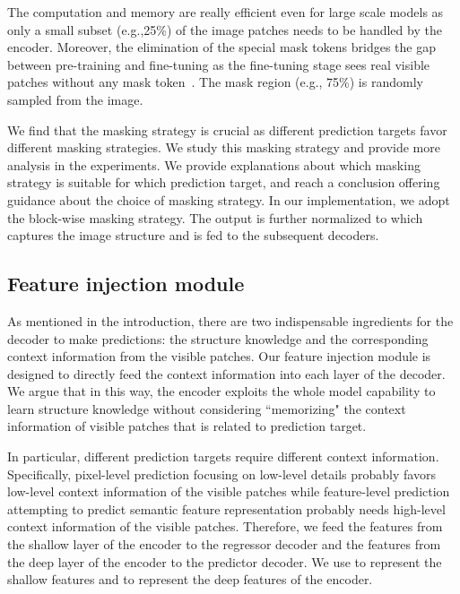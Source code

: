 \documentclass[runningheads]{llncs}
\begin{document}
The computation and memory are really efficient even for large scale models as only a small subset (e.g.,25\%) of the image patches needs to be handled by the encoder.
Moreover, the elimination of the special mask tokens bridges the gap between pre-training and fine-tuning as the fine-tuning stage sees real visible patches without any mask token~\cite{he2021masked,fang2022corrupted}.
The mask region (e.g., 75\%) is randomly sampled from the image.

We find that the masking strategy is crucial as different prediction targets favor different masking strategies.
We study this masking strategy and provide more analysis in the experiments.
We provide explanations about which masking strategy is suitable for which prediction target, and reach a conclusion offering guidance about the choice of masking strategy.
In our implementation, we adopt the block-wise masking strategy.
The output is further normalized to  which captures the image structure and is fed to the subsequent decoders.

\vspace{-1mm}
\subsection{Feature injection module}
\vspace{-1mm}
As mentioned in the introduction, there are two indispensable ingredients for the decoder to make predictions: the structure knowledge and the corresponding context information from the visible patches.
Our feature injection module is designed to directly feed the context information into each layer of the decoder.
We argue that in this way, the encoder exploits the whole model capability to learn structure knowledge without considering ``memorizing" the context information of visible patches that is related to prediction target.

In particular, different prediction targets require different context information. Specifically, pixel-level prediction focusing on low-level details probably favors low-level context information of the visible patches while feature-level prediction attempting to predict semantic feature representation probably needs high-level context information of the visible patches.
Therefore, we feed the features from the shallow layer of the encoder to the regressor decoder and the features from the deep layer of the encoder to the predictor decoder. 
We use  to represent the shallow features and  to represent the deep features of the encoder.
\end{document}

